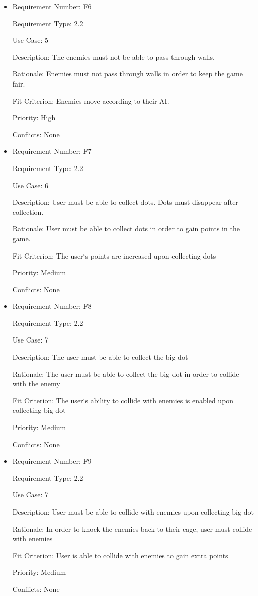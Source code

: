 \documentclass[12pt, titlepage]{article}
\begin{document}
\begin{itemize}
\item
Requirement Number: F6

Requirement Type: 2.2

Use Case: 5

Description: The enemies must not be able to pass through walls.

Rationale: Enemies must not pass through walls in order to keep the game fair.

Fit Criterion: Enemies move according to their AI.

Priority: High

Conflicts: None
\end{itemize}

\begin{itemize}
\item
Requirement Number: F7

Requirement Type: 2.2

Use Case: 6

Description: User must be able to collect dots. Dots must disappear after collection.

Rationale: User must be able to collect dots in order to gain points in the game.

Fit Criterion: The user`s points are increased upon collecting dots

Priority: Medium

Conflicts: None
\end{itemize}

\begin{itemize}
\item
Requirement Number: F8

Requirement Type: 2.2

Use Case: 7

Description: The user must be able to collect the big dot

Rationale: The user must be able to collect the big dot in order to collide with the enemy

Fit Criterion: The user`s ability to collide with enemies is enabled upon collecting big dot

Priority: Medium

Conflicts: None
\end{itemize}

\begin{itemize}
\item
Requirement Number: F9

Requirement Type: 2.2

Use Case: 7

Description: User must be able to collide with enemies upon collecting big dot

Rationale: In order to knock the enemies back to their cage, user must collide with enemies

Fit Criterion: User is able to collide with enemies to gain extra points

Priority: Medium

Conflicts: None
\end{itemize}
\end{document}
